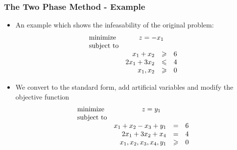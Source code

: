 \documentclass{beamer}
\theoremstyle{plain}
\let\le\leqslant
\let\ge\geqslant
\begin{document}
\begin{frame}\frametitle{The Two Phase Method - Example}
\justifying

\begin{itemize}
\justifying

\item An example which shows the infeasability of the original problem:
\[ \begin{array}{lrcr}
\textrm{minimize} & \multicolumn{3}{c}{z = -x_1}  \\
\textrm{subject to} & \\
& x_1 + x_2 & \ge & 6 \\
& 2x_1 + 3x_2 & \le & 4 \\
& x_1, x_2 & \ge & 0
\end{array}
\]

\item We convert to the standard form, add artificial variables and modify the objective function
\[ \begin{array}{lrcr}
\textrm{minimize} & \multicolumn{3}{c}{z = y_1 }  \\
\textrm{subject to} & \\
& x_1 + x_2 - x_3 + y_1 & = & 6 \\
& 2x_1 + 3x_2 +x_4 & = & 4 \\
& x_1, x_2, x_3, x_4, y_1 & \ge & 0
\end{array}
\]

\end{itemize}

\end{frame}
\end{document}
